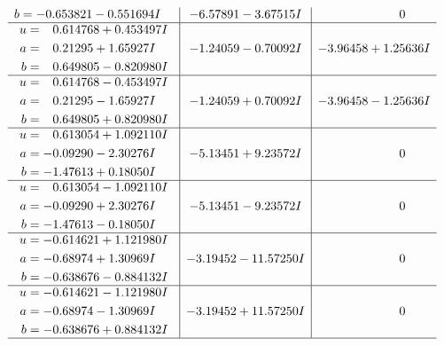 \documentclass[1p]{elsarticle_modified}
\theoremstyle{definition}
\begin{document}
$$\begin{array}{c|c|c}
\begin{aligned}
b &= -0.653821 - 0.551694 I\end{aligned}
 & -6.57891 - 3.67515 I & \phantom{-0.000000 } 0 \\ \hline\begin{aligned}
u &= \phantom{-}0.614768 + 0.453497 I \\
a &= \phantom{-}0.21295 + 1.65927 I \\
b &= \phantom{-}0.649805 - 0.820980 I\end{aligned}
 & -1.24059 - 0.70092 I & -3.96458 + 1.25636 I \\ \hline\begin{aligned}
u &= \phantom{-}0.614768 - 0.453497 I \\
a &= \phantom{-}0.21295 - 1.65927 I \\
b &= \phantom{-}0.649805 + 0.820980 I\end{aligned}
 & -1.24059 + 0.70092 I & -3.96458 - 1.25636 I \\ \hline\begin{aligned}
u &= \phantom{-}0.613054 + 1.092110 I \\
a &= -0.09290 - 2.30276 I \\
b &= -1.47613 + 0.18050 I\end{aligned}
 & -5.13451 + 9.23572 I & \phantom{-0.000000 } 0 \\ \hline\begin{aligned}
u &= \phantom{-}0.613054 - 1.092110 I \\
a &= -0.09290 + 2.30276 I \\
b &= -1.47613 - 0.18050 I\end{aligned}
 & -5.13451 - 9.23572 I & \phantom{-0.000000 } 0 \\ \hline\begin{aligned}
u &= -0.614621 + 1.121980 I \\
a &= -0.68974 + 1.30969 I \\
b &= -0.638676 - 0.884132 I\end{aligned}
 & -3.19452 - 11.57250 I & \phantom{-0.000000 } 0 \\ \hline\begin{aligned}
u &= -0.614621 - 1.121980 I \\
a &= -0.68974 - 1.30969 I \\
b &= -0.638676 + 0.884132 I\end{aligned}
 & -3.19452 + 11.57250 I & \phantom{-0.000000 } 0\\
 \hline 
 \end{array}$$\newpage$$\begin{array}{c|c|c}  

\end{array}$$
\end{document}
